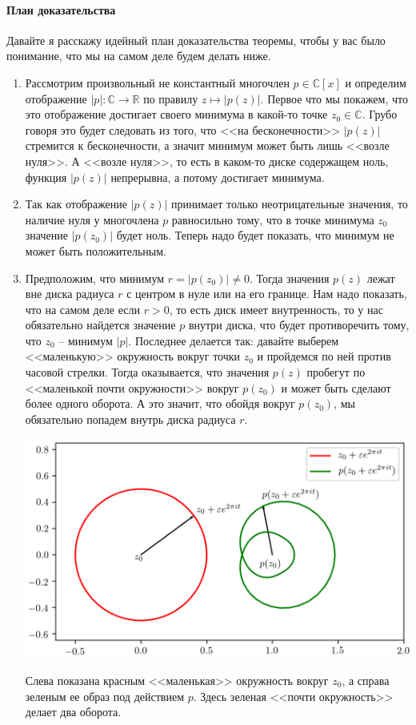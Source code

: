 \paragraph{План доказательства}

Давайте я расскажу идейный план доказательства теоремы, чтобы у вас было понимание, что мы на самом деле будем делать ниже.
\begin{enumerate}
\item Рассмотрим произвольный не константный многочлен $p\in \mathbb C[x]$ и определим отображение $|p| \colon \mathbb C\to \mathbb R$ по правилу $z \mapsto |p(z)|$.
Первое что мы покажем, что это отображение достигает своего минимума в какой-то точке $z_0\in\mathbb C$.
Грубо говоря это будет следовать из того, что <<на бесконечности>> $|p(z)|$ стремится к бесконечности, а значит минимум может быть лишь <<возле нуля>>.
А <<возле нуля>>, то есть в каком-то диске содержащем ноль, функция $|p(z)|$ непрерывна, а потому достигает минимума.

\item Так как отображение $|p(z)|$ принимает только неотрицательные значения, то наличие нуля у многочлена $p$ равносильно тому, что в точке минимума $z_0$ значение $|p(z_0)|$ будет ноль.
Теперь надо будет показать, что минимум не может быть положительным.

\item Предположим, что минимум $r = |p(z_0)| \neq 0$.
Тогда значения $p(z)$ лежат вне диска радиуса $r$ с центром в нуле или на его границе.
Нам надо показать, что на самом деле если $r > 0$, то есть диск имеет внутренность, то у нас обязательно найдется значение $p$ внутри диска, что будет противоречить тому, что $z_0$ -- минимум $|p|$.
Последнее делается так: давайте выберем <<маленькую>> окружность вокруг точки $z_0$ и пройдемся по ней против часовой стрелки.
Тогда оказывается, что значения $p(z)$ пробегут по <<маленькой почти окружности>> вокруг $p(z_0)$ и может быть сделают более одного оборота.
А это значит, что обойдя вокруг $p(z_0)$, мы обязательно попадем внутрь диска радиуса $r$.
\begin{center}
\includegraphics[scale = 0.5]{Figures/graph_cyrcle_cut.png}

Слева показана красным <<маленькая>> окружность вокруг $z_0$, а справа зеленым ее образ под действием $p$.
Здесь зеленая <<почти окружность>> делает два оборота.
\end{center}
\end{enumerate}
